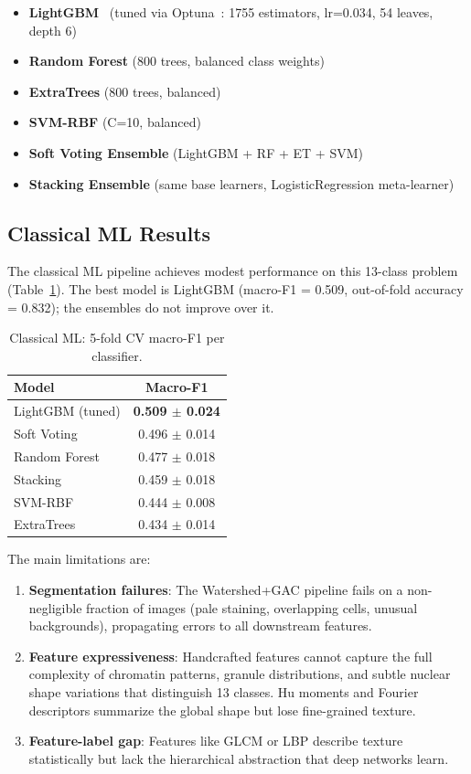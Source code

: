 \documentclass[twocolumn,a4paper]{article}
\begin{document}
\begin{itemize}
    \item \textbf{LightGBM}~\cite{ke2017lightgbm} (tuned via Optuna~\cite{akiba2019optuna}: 1755 estimators, lr=0.034, 54 leaves, depth 6)
    \item \textbf{Random Forest} (800 trees, balanced class weights)
    \item \textbf{ExtraTrees} (800 trees, balanced)
    \item \textbf{SVM-RBF} (C=10, balanced)
    \item \textbf{Soft Voting Ensemble} (LightGBM + RF + ET + SVM)
    \item \textbf{Stacking Ensemble} (same base learners, LogisticRegression meta-learner)
\end{itemize}

\subsection{Classical ML Results}

The classical ML pipeline achieves modest performance on this 13-class problem (Table~\ref{tab:classical_results}). The best model is LightGBM (macro-F1 = 0.509, out-of-fold accuracy = 0.832); the ensembles do not improve over it.

\begin{table}[htbp]
\centering
\caption{Classical ML: 5-fold CV macro-F1 per classifier.}
\label{tab:classical_results}
\small
\begin{tabular}{lc}
\toprule
\textbf{Model} & \textbf{Macro-F1} \\
\midrule
LightGBM (tuned) & \textbf{0.509 $\pm$ 0.024} \\
Soft Voting & 0.496 $\pm$ 0.014 \\
Random Forest & 0.477 $\pm$ 0.018 \\
Stacking & 0.459 $\pm$ 0.018 \\
SVM-RBF & 0.444 $\pm$ 0.008 \\
ExtraTrees & 0.434 $\pm$ 0.014 \\
\bottomrule
\end{tabular}
\end{table}

The main limitations are:

\begin{enumerate}
    \item \textbf{Segmentation failures}: The Watershed+GAC pipeline fails on a non-negligible fraction of images (pale staining, overlapping cells, unusual backgrounds), propagating errors to all downstream features.
    \item \textbf{Feature expressiveness}: Handcrafted features cannot capture the full complexity of chromatin patterns, granule distributions, and subtle nuclear shape variations that distinguish 13 classes. Hu moments and Fourier descriptors summarize the global shape but lose fine-grained texture.
    \item \textbf{Feature-label gap}: Features like GLCM or LBP describe texture statistically but lack the hierarchical abstraction that deep networks learn.
\end{enumerate}
\end{document}
